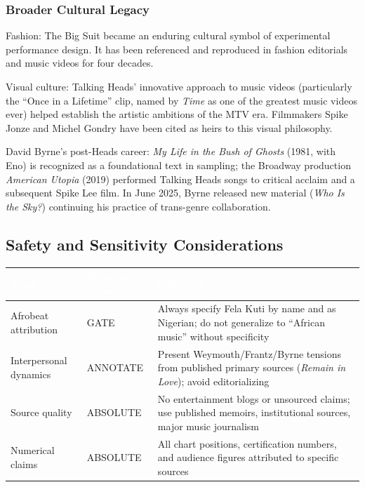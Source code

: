 \documentclass[11pt,letterpaper]{article}
\newcommand{\tableheader}[1]{\textbf{\sffamily\textcolor{white}{#1}}}
\begin{document}
\subsubsection{Broader Cultural Legacy}

Fashion: The Big Suit became an enduring cultural symbol of experimental performance design. It has been referenced and reproduced in fashion editorials and music videos for four decades.

Visual culture: Talking Heads' innovative approach to music videos (particularly the ``Once in a Lifetime'' clip, named by \textit{Time} as one of the greatest music videos ever) helped establish the artistic ambitions of the MTV era. Filmmakers Spike Jonze and Michel Gondry have been cited as heirs to this visual philosophy.

David Byrne's post-Heads career: \textit{My Life in the Bush of Ghosts} (1981, with Eno) is recognized as a foundational text in sampling; the Broadway production \textit{American Utopia} (2019) performed Talking Heads songs to critical acclaim and a subsequent Spike Lee film. In June 2025, Byrne released new material (\textit{Who Is the Sky?}) continuing his practice of trans-genre collaboration.

\subsection{Safety and Sensitivity Considerations}

\begin{center}
\begin{tabularx}{\textwidth}{L{3.5cm}L{2.5cm}X}
\toprule
{}
\tableheader{Area} & \tableheader{Boundary Type} & \tableheader{Guidance} \\
\midrule
Afrobeat attribution & GATE & Always specify Fela Kuti by name and as Nigerian; do not generalize to ``African music'' without specificity \\
Interpersonal dynamics & ANNOTATE & Present Weymouth/Frantz/Byrne tensions from published primary sources (\textit{Remain in Love}); avoid editorializing \\
Source quality & ABSOLUTE & No entertainment blogs or unsourced claims; use published memoirs, institutional sources, major music journalism \\
Numerical claims & ABSOLUTE & All chart positions, certification numbers, and audience figures attributed to specific sources \\
\bottomrule
\end{tabularx}
\end{center}
\end{document}

